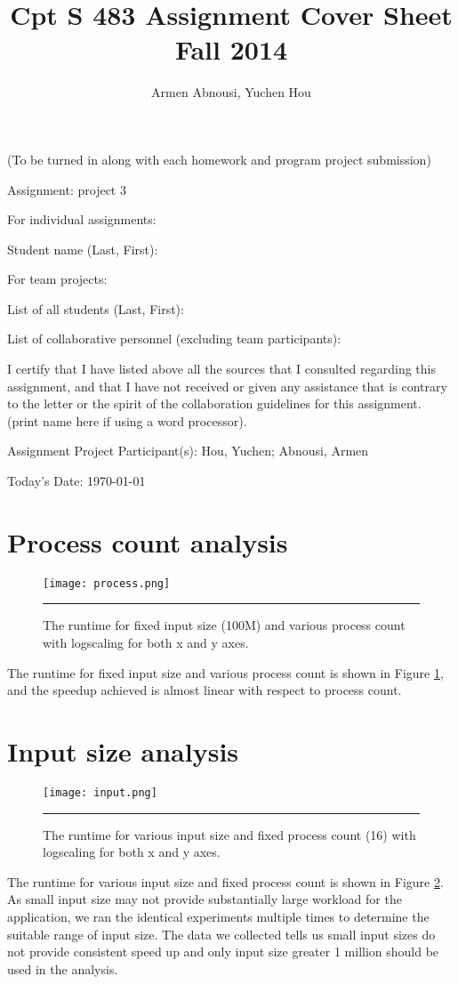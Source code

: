 \documentclass[12pt]{article}
\begin{document}
\title{Cpt S 483 Assignment Cover Sheet \\ Fall 2014
}
\author{Armen Abnousi, Yuchen Hou}
\maketitle

(To be turned in along with each homework and program project submission)

Assignment: project 3

For individual assignments:

Student name (Last, First):

For team projects:

List of all students (Last, First):

List of collaborative personnel (excluding team participants):

I certify that I have listed above all the sources that I consulted regarding this assignment, and that I have not received or given any assistance that is contrary to the letter or the spirit of the collaboration guidelines for this assignment. (print name here if using a word processor).

Assignment Project Participant(s): Hou, Yuchen; Abnousi, Armen

Today's Date: \today

\pagebreak

\section{Process count analysis}
\begin{figure}[htb]
  \centering
      {\texttt{[image: process.png]}} \rule{1\linewidth}{1pt}
      \caption{The runtime for fixed input size (100M) and various process count with logscaling for both x and y axes.}
      \label{fig:process}
\end{figure}
The runtime for fixed input size and various process count is shown in Figure \ref{fig:process}, and the speedup achieved is almost linear with respect to process count.
\section{Input size analysis}
\begin{figure}[htb]
  \centering
      {\texttt{[image: input.png]}} \rule{1\linewidth}{1pt}
      \caption{The runtime for various input size and fixed process count (16) with logscaling for both x and y axes.}
      \label{fig:input}
\end{figure}
The runtime for various input size and fixed process count is shown in Figure \ref{fig:input}. As small input size may not provide substantially large workload for the application, we ran the identical experiments multiple times to determine the suitable range of input size. The data we collected tells us small input sizes do not provide consistent speed up and only input size greater 1 million should be used in the analysis.
\end{document}
